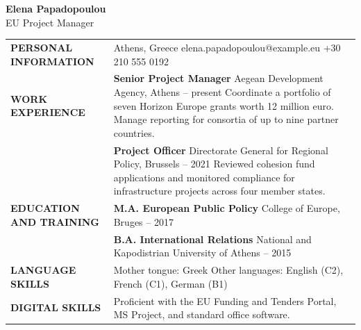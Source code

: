 \documentclass[10pt,a4paper]{article}
\begin{document}
\begin{center}
{\Huge\bfseries\color{accent} Elena Papadopoulou}\\[3pt]
{\Large EU Project Manager}
\end{center}

\vspace{10pt}
\noindent
\begin{tabular}{@{}p{1.3in}p{4.6in}@{}}
\textcolor{accent}{\bfseries PERSONAL INFORMATION} &
Athens, Greece \newline
elena.papadopoulou@example.eu \newline
+30 210 555 0192 \\[10pt]

\textcolor{accent}{\bfseries WORK EXPERIENCE} &
\textbf{Senior Project Manager} \newline
Aegean Development Agency, Athens \newline
2021 -- present \newline
Coordinate a portfolio of seven Horizon Europe grants worth 12 million euro. Manage reporting for consortia of up to nine partner countries. \\[8pt]
& \textbf{Project Officer} \newline
Directorate General for Regional Policy, Brussels \newline
2017 -- 2021 \newline
Reviewed cohesion fund applications and monitored compliance for infrastructure projects across four member states. \\[10pt]

\textcolor{accent}{\bfseries EDUCATION AND TRAINING} &
\textbf{M.A. European Public Policy} \newline
College of Europe, Bruges \newline
2015 -- 2017 \\[6pt]
& \textbf{B.A. International Relations} \newline
National and Kapodistrian University of Athens \newline
2011 -- 2015 \\[10pt]

\textcolor{accent}{\bfseries LANGUAGE SKILLS} &
Mother tongue: Greek \newline
Other languages: English (C2), French (C1), German (B1) \\[10pt]

\textcolor{accent}{\bfseries DIGITAL SKILLS} &
Proficient with the EU Funding and Tenders Portal, MS Project, and standard office software. \\
\end{tabular}
\end{document}
